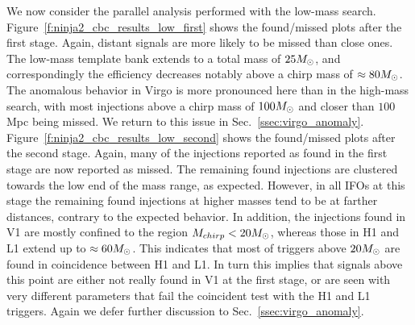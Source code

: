 We now consider the parallel analysis performed with the low-mass
search.  Figure~\ref{f:ninja2_cbc_results_low_first} shows the
found/missed plots after the first stage.  Again, distant signals are
more likely to be missed than close ones.  The low-mass template bank
extends to a total mass of $25M_\odot$, and correspondingly the
efficiency decreases notably above a chirp mass of $\approx 80 M_\odot$.
The anomalous behavior in Virgo is more pronounced here than in the
high-mass search, with most injections above a chirp mass of $100
M_\odot$ and closer than $100$ Mpc being missed.  We return to this
issue in Sec.~\ref{ssec:virgo_anomaly}.
Figure~\ref{f:ninja2_cbc_results_low_second} shows the found/missed
plots after the second stage.  Again, many of the injections reported
as found in the first stage are now reported as missed.  The remaining
found injections are clustered towards the low end of the mass range,
as expected.  However, in all IFOs at this stage the remaining found
injections at higher masses tend to be at farther distances, contrary
to the expected behavior.  In addition, the injections found in V1 are
mostly confined to the region $M_{chirp} < 20 M_\odot$, whereas those in
H1 and L1 extend up to $\approx 60 M_\odot$.  This indicates that most
of triggers above $20 M_\odot$ are found in coincidence between H1 and
L1.  In turn this implies that signals above this point are either not
really found in V1 at the first stage, or are seen with very different
parameters that fail the coincident test with the H1 and L1 triggers.
Again we defer further discussion to Sec.~\ref{ssec:virgo_anomaly}.


